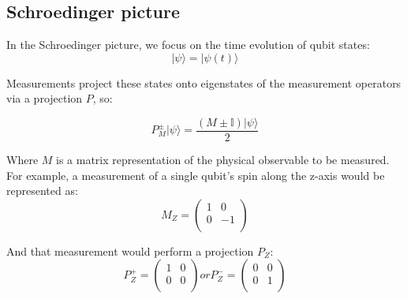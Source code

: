 \subsection{Schroedinger picture}
In the Schroedinger picture, we focus on the time evolution of qubit states:
\begin{equation}  
	|\psi\rangle = |\psi(t)\rangle 
\end{equation}

Measurements project these states onto eigenstates of the measurement operators via
a projection $P$, so:

\begin{equation}
    P_M^{\pm} |\psi\rangle = \frac{(M\pm \mathbb{I})|\psi\rangle}{2}
\end{equation}

Where $M$ is a matrix representation of the physical observable
 to be measured.
For example, a measurement of a single qubit's spin along the z-axis would be
represented as:
\begin{equation}
    M_Z = \left(
        \begin{array}{cc}
            1 & 0 \\
            0 & -1 \\
        \end{array}
        \right)
\end{equation}

And that measurement would perform a projection $P_Z$:
\begin{equation}
    P_Z^+ = \left(
        \begin{array}{cc}
            1 & 0 \\
            0 & 0 \\
        \end{array}
        \right)
    or
    P_Z^- = \left(
        \begin{array}{cc}
            0 & 0 \\
            0 & 1 \\
        \end{array}
        \right)
\end{equation}

